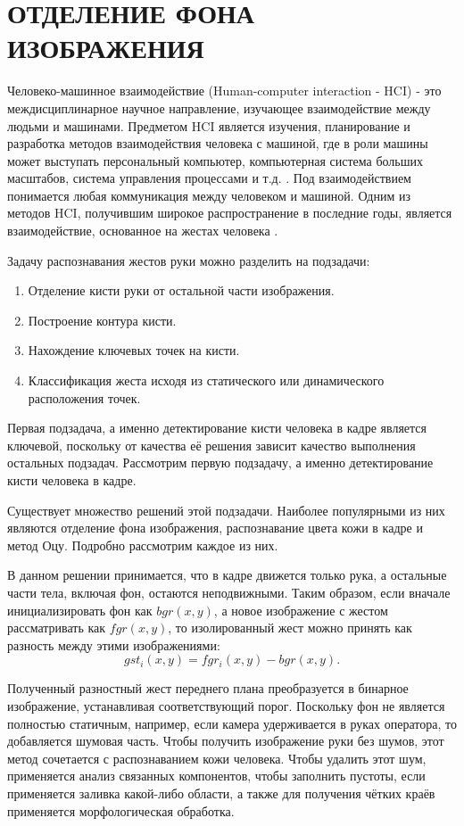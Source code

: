 \section{\centering ОТДЕЛЕНИЕ ФОНА ИЗОБРАЖЕНИЯ}

Человеко-машинное взаимодействие (Human-computer interaction - HCI) - это междисциплинарное
научное направление, изучающее взаимодействие между людьми и машинами. Предметом HCI является
изучения, планирование и разработка методов взаимодействия человека с машиной, где в роли машины
может выступать персональный компьютер, компьютерная система больших масштабов, система 
управления процессами и т.д. \cite{dix}. Под взаимодействием понимается любая коммуникация между
человеком и машиной. Одним из методов HCI, получившим широкое распространение в последние годы,
является взаимодействие, основанное на жестах человека \cite{jiangqin, sanna}. 

Задачу распознавания жестов руки можно разделить на подзадачи:
\begin{enumerate}
	\item Отделение кисти руки от остальной части изображения.
	\item Построение контура кисти.
	\item Нахождение ключевых точек на кисти.
	\item Классификация жеста исходя из статического или динамического расположения точек.
\end{enumerate}

Первая подзадача, а именно детектирование кисти человека в кадре является ключевой, поскольку
от качества её решения зависит качество выполнения остальных подзадач.
Рассмотрим первую подзадачу, а именно детектирование кисти человека в кадре.

Существует множество решений этой подзадачи. Наиболее популярными из них являются 
отделение фона изображения, распознавание цвета кожи в кадре и метод Оцу. 
Подробно рассмотрим каждое из них.

В данном решении принимается, что в кадре движется только рука, а остальные части
тела, включая фон, остаются неподвижными. Таким образом, если вначале инициализировать фон как
$bgr(x, y)$, а новое изображение с жестом рассматривать как $fgr(x, y)$, то изолированный жест
можно принять как разность между этими изображениями: 
\begin{equation} gst_i(x,y)=fgr_i(x,y)-bgr(x,y). \label{first}\end{equation}

Полученный разностный жест переднего плана преобразуется в бинарное изображение, устанавливая
соответствующий порог. Поскольку фон не является полностью статичным, например, если камера
удерживается в руках оператора, то добавляется шумовая часть. Чтобы получить изображение руки
без шумов, этот метод сочетается с распознаванием кожи человека. Чтобы удалить этот шум, 
применяется анализ связанных компонентов, чтобы заполнить пустоты, если применяется заливка
какой-либо области, а также для получения чётких краёв применяется морфологическая обработка.

